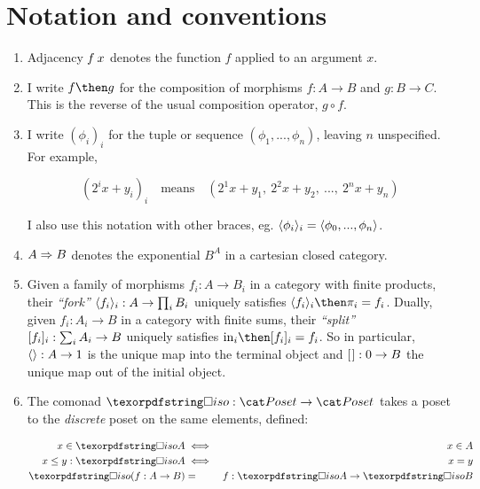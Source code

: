 \documentclass{rntz}\usepackage[a5]{rntzgeometry}\usepackage[fullwidth=130mm,width=330pt,]{narrow}
\begin{document}


\section{Notation and conventions}

\begin{enumerate}
\item Adjacency $f\<x$ denotes the function $f$ applied to an argument $x$.

\item I write $f \then g$ for the composition of morphisms $f : A \to B$ and $g
  : B \to C$. This is the reverse of the usual composition operator, $g \circ
  f$.

  \newcommand\iexpr{\phi}
\item I write $(\iexpr_i)_i$ for the tuple or sequence $(\iexpr_1,
  ..., \iexpr_n)$, leaving $n$ unspecified. For example,

  \nopagebreak[2]
  \[ (2^ix + y_i)_i \quad\text{means}\quad
  (2^1x + y_1,~ 2^2x + y_2,~ ...,~ 2^nx + y_n) \]

  \noindent
  I also use this notation with other braces, eg. $\fork{\iexpr_i}_i =
  \fork{\iexpr_0, ..., \iexpr_n}$.

\item $A \Rightarrow B$ denotes the exponential $B^A$ in a cartesian closed category.

\item Given a family of morphisms $f_i : A \to B_i$ in a category with finite
  products, their \emph{``fork''} $\langle{f_i}\rangle_i : A \to \textstyle\prod_{i} B_i$
  uniquely satisfies $\fork{f_i}_i \then \pi_i = f_i$. Dually, given $f_i : A_i
  \to B$ in a category with finite sums, their \emph{``split''} $[{f_i}]_i :
  \sum_i A_i \to B$ uniquely satisfies $\injc_i \then \krof{f_i}_i = f_i$.
  So in particular, $\langle{}\rangle : A \to 1$ is the unique map into the terminal
  object and $[{\kern .08em}] : 0 \to B$ the unique map out of the initial object.

\item The comonad $\iso : \Poset \to \Poset$ takes a poset to the
  \emph{discrete} poset on the same elements, defined:

  \begin{eqnarray*}
    x \in \isof A &\iff& x \in A\\
    x \le y : \isof A &\iff& x = y\\
    \isof(f : A \to B) &=& f : \isof A \to \isof B
  \end{eqnarray*}
\end{enumerate}
\end{document}
